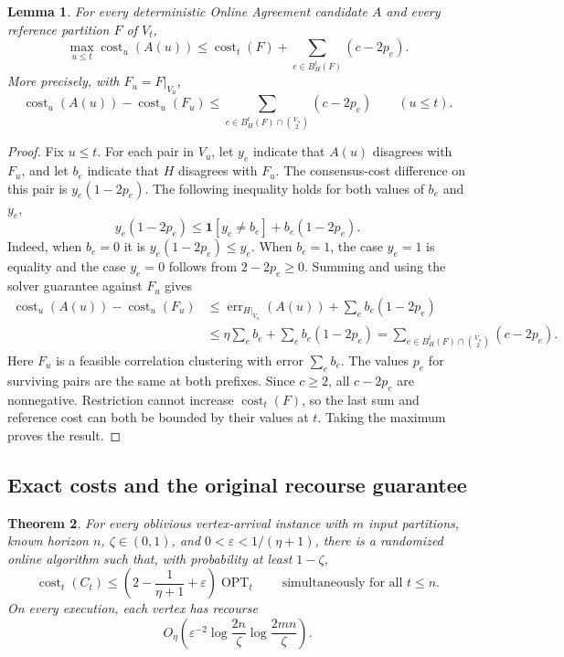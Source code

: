 \documentclass[11pt]{article}
\newtheorem{theorem}{Theorem}[section]
\newtheorem{lemma}[theorem]{Lemma}
\begin{document}
\begin{lemma}\label{lem:improved-weighted-history}
For every deterministic Online Agreement candidate $A$ and every
reference partition $F$ of $V_t$,
\[
 \max_{u\le t}\operatorname{cost}_u(A(u))
 \le\operatorname{cost}_t(F)
       +\sum_{e\in B_H^t(F)}(c-2p_e).
\]
More precisely, with $F_u=F|_{V_u}$,
\[
 \operatorname{cost}_u(A(u))-\operatorname{cost}_u(F_u)
 \le\sum_{e\in B_H^t(F)\cap\binom{V_u}{2}}(c-2p_e)
 \qquad(u\le t).
\]
\end{lemma}
\begin{proof}
Fix $u\le t$. For each pair in $V_u$, let $y_e$ indicate that $A(u)$
disagrees with $F_u$, and let $b_e$ indicate that $H$ disagrees with
$F_u$. The consensus-cost difference on this pair is $y_e(1-2p_e)$.
The following inequality holds for both values of $b_e$ and $y_e$,
\[
 y_e(1-2p_e)\le \mathbf1[y_e\ne b_e]+b_e(1-2p_e).
\]
Indeed, when $b_e=0$ it is $y_e(1-2p_e)\le y_e$. When $b_e=1$,
the case $y_e=1$ is equality and the case $y_e=0$ follows from
$2-2p_e\ge0$. Summing and using the solver guarantee against $F_u$
gives
\begin{align*}
 \operatorname{cost}_u(A(u))-\operatorname{cost}_u(F_u)
 &\le \operatorname{err}_{H|_{V_u}}(A(u))
          +\sum_e b_e(1-2p_e)\\
 &\le \eta\sum_e b_e+\sum_e b_e(1-2p_e)
 =\sum_{e\in B_H^t(F)\cap\binom{V_u}{2}}(c-2p_e).
\end{align*}
Here $F_u$ is a feasible correlation clustering with error $\sum_e b_e$.
The values $p_e$ for surviving pairs are the same at both prefixes.
Since $c\ge2$, all $c-2p_e$ are nonnegative. Restriction cannot increase
$\operatorname{cost}_t(F)$, so the last sum and reference cost can both
be bounded by their values at $t$. Taking the maximum proves the result.
\end{proof}

\subsection{Exact costs and the original recourse guarantee}

\begin{theorem}\label{thm:improved-online-exact}
For every oblivious vertex-arrival instance with $m$ input partitions,
known horizon $n$, $\zeta\in(0,1)$, and
$0<\varepsilon<1/(\eta+1)$, there is a randomized online algorithm such
that, with probability at least $1-\zeta$,
\[
 \operatorname{cost}_t(C_t)
 \le \left(2-\frac{1}{\eta+1}+\varepsilon\right)
       \operatorname{OPT}_t
 \qquad\text{simultaneously for all }t\le n.
\]
On every execution, each vertex has recourse
\[
 O_\eta\!\left(
  \varepsilon^{-2}\log\frac{2n}{\zeta}\log\frac{2mn}{\zeta}
 \right).
\]
\end{theorem}
\end{document}
